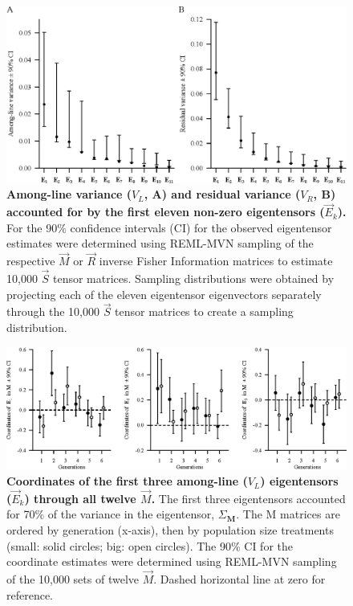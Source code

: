 \begin{figure}[htp]
\includegraphics[width=1\textwidth]{Chp3_Multi/DaveFigTwoEigtensors.eps}
\vspace*{-0.4cm}
\caption[Among-line variance ($V_L$, A) and residual variance ($V_R$, B) accounted for by the first eleven non-zero eigentensors ($\vec{E}_k$).]{\textbf{Among-line variance ($V_L$, A) and residual variance ($V_R$, B) accounted for by the first eleven non-zero eigentensors ($\vec{E}_k$).} For the 90\% confidence intervals (CI) for the observed eigentensor estimates were determined using REML-MVN sampling of the respective $\vec{M}$ or $\vec{R}$ inverse Fisher Information matrices to estimate 10,000 $\vec{S}$ tensor matrices. Sampling distributions were obtained by projecting each of the eleven eigentensor eigenvectors separately through the 10,000 $\vec{S}$ tensor matrices to create a sampling distribution.}
\label{fig:multi_TwoEigTen}
\end{figure}
\FloatBarrier

\newpage
\begin{figure}[!htp]
\includegraphics[width=1\textwidth]{Chp3_Multi/VL_Coords.eps}
\vspace*{-0.4cm}
\caption[Coordinates of the first three among-line ($V_L$) eigentensors ($\vec{E}_k$) through all twelve $\vec{M}$.]{\textbf{Coordinates of the first three among-line ($V_L$) eigentensors ($\vec{E}_k$) through all twelve $\vec{M}$.} The first three eigentensors accounted for 70\% of the variance in the eigentensor, $\Sigma_{\textbf{M}}$. The M matrices are ordered by generation (x-axis), then by population size treatments (small: solid circles; big: open circles). The 90\% CI for the coordinate estimates were determined using REML-MVN sampling of the 10,000 sets of twelve $\vec{M}$. Dashed horizontal line at zero for reference.}
\label{fig:multi_VLcoords}
\end{figure}
\FloatBarrier
\vspace{4cm}

